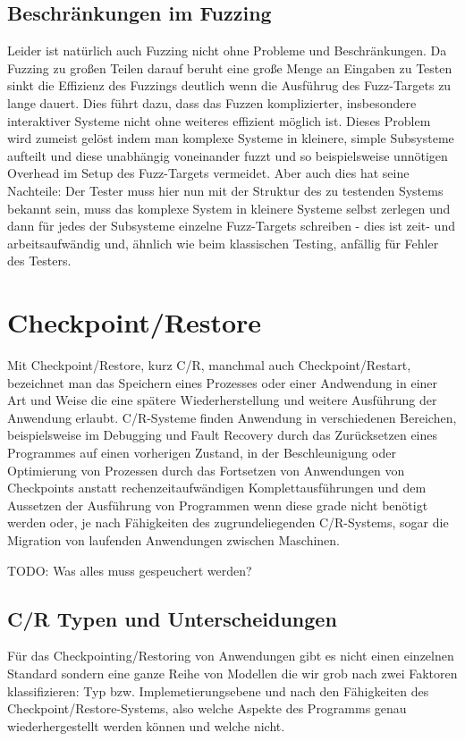 \documentclass[a4paper]{article}
\begin{document}
\subsection{Beschränkungen im Fuzzing}
Leider ist natürlich auch Fuzzing nicht ohne Probleme und Beschränkungen. Da Fuzzing zu großen Teilen darauf beruht eine große Menge an Eingaben zu Testen sinkt die Effizienz des Fuzzings deutlich wenn die Ausführug des Fuzz-Targets zu lange dauert. Dies führt dazu, dass das Fuzzen komplizierter, insbesondere interaktiver Systeme nicht ohne weiteres effizient möglich ist. Dieses Problem wird zumeist gelöst indem man komplexe Systeme in kleinere, simple Subsysteme aufteilt und diese unabhängig voneinander fuzzt und so beispielsweise unnötigen Overhead im Setup des Fuzz-Targets vermeidet. Aber auch dies hat seine Nachteile: Der Tester muss hier nun mit der Struktur des zu testenden Systems bekannt sein, muss das komplexe System in kleinere Systeme selbst zerlegen und dann für jedes der Subsysteme einzelne Fuzz-Targets schreiben - dies ist zeit- und arbeitsaufwändig und, ähnlich wie beim klassischen Testing, anfällig für Fehler des Testers. 

\section{Checkpoint/Restore}

Mit Checkpoint/Restore, kurz C/R, manchmal auch Checkpoint/Restart, bezeichnet man das Speichern eines Prozesses oder einer Andwendung in einer Art und Weise die eine spätere Wiederherstellung und weitere Ausführung der Anwendung erlaubt.
C/R-Systeme finden Anwendung in verschiedenen Bereichen, beispielsweise im Debugging und Fault Recovery durch das Zurücksetzen eines Programmes auf einen vorherigen Zustand, in der Beschleunigung oder Optimierung von Prozessen durch das Fortsetzen von Anwendungen von Checkpoints anstatt rechenzeitaufwändigen Komplettausführungen und dem Aussetzen der Ausführung von Programmen wenn diese grade nicht benötigt werden oder, je nach Fähigkeiten des zugrundeliegenden C/R-Systems, sogar die Migration von laufenden Anwendungen zwischen Maschinen.

TODO: Was alles muss gespeuchert werden? 

\subsection{C/R Typen und Unterscheidungen}
Für das Checkpointing/Restoring von Anwendungen gibt es nicht einen einzelnen Standard sondern eine ganze Reihe von Modellen die wir grob nach zwei Faktoren klassifizieren: Typ bzw. Implemetierungsebene und nach den Fähigkeiten des Checkpoint/Restore-Systems, also welche Aspekte des Programms genau wiederhergestellt werden können und welche nicht.
\end{document}

